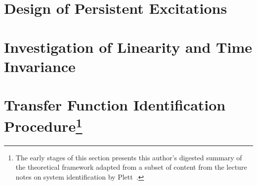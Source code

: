 \section{Design of Persistent Excitations}\label{sec:persistentexcitation}


\section{Investigation of Linearity and Time Invariance}\label{sec:lticheck}


\section[Transfer Function Identification Procedure]{Transfer Function Identification Procedure\footnote{The early stages of this section presents this author's digested summary of the theoretical framework adapted from a subset of content from the lecture notes on system identification by Plett~\cite{PlettECE5560_02,PlettECE5560_03,PlettECE5560_04}.}}\label{sec:actualsysid}








